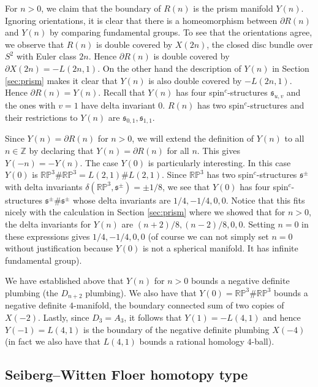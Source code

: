 \documentclass{amsart}
\theoremstyle{definition}
\theoremstyle{remark}
\numberwithin{equation}{section}
\begin{document}
For $n > 0$, we claim that the boundary of $R(n)$ is the prism manifold $Y(n)$. Ignoring orientations, it is clear that there is a homeomorphism between $\partial R(n)$ and $Y(n)$ by comparing fundamental groups. To see that the orientations agree, we observe that $R(n)$ is double covered by $X(2n)$, the closed disc bundle over $S^2$ with Euler class $2n$. Hence $\partial R(n)$ is double covered by $\partial X(2n) = -L(2n,1)$. On the other hand the description of $Y(n)$ in Section \ref{sec:prism} makes it clear that $Y(n)$ is also double covered by $-L(2n,1)$. Hence $\partial R(n) = Y(n)$. Recall that $Y(n)$ has four spin$^c$-structures $\mathfrak{s}_{u,v}$ and the ones with $v=1$ have delta invariant $0$. $R(n)$ has two spin$^c$-structures and their restrictions to $Y(n)$ are $\mathfrak{s}_{0,1}, \mathfrak{s}_{1,1}$.

Since $Y(n) = \partial R(n)$ for $n > 0$, we will extend the definition of $Y(n)$ to all $n \in \mathbb{Z}$ by declaring that $Y(n) = \partial R(n)$ for all $n$. This gives $Y(-n) = -Y(n)$. The case $Y(0)$ is particularly interesting. In this case $Y(0)$ is $\mathbb{RP}^3 \# \mathbb{RP}^3 = L(2,1) \# L(2,1)$. Since $\mathbb{RP}^3$ has two spin$^c$-structures $\mathfrak{s}^{\pm}$ with delta invariants $\delta( \mathbb{RP}^3 , \mathfrak{s}^{\pm} ) = \pm 1/8$, we see that $Y(0)$ has four spin$^c$-structures $\mathfrak{s}^{\pm} \# \mathfrak{s}^{\pm}$ whose delta invariants are $1/4, -1/4, 0 , 0$. Notice that this fits nicely with the calculation in Section \ref{sec:prism} where we showed that for $n>0$, the delta invariants for $Y(n)$ are $(n+2)/8, (n-2)/8 , 0 , 0$. Setting $n=0$ in these expressions gives $1/4, -1/4 , 0 , 0$ (of course we can not simply set $n=0$ without justification because $Y(0)$ is not a spherical manifold. It has infinite fundamental group).

We have established above that $Y(n)$ for $n>0$ bounds a negative definite plumbing (the $D_{n+2}$ plumbing). We also have that $Y(0) = \mathbb{RP}^3 \# \mathbb{RP}^3$ bounds a negative definite $4$-manifold, the boundary connected sum of two copies of $X(-2)$. Lastly, since $D_3 = A_3$, it follows that $Y(1) = -L(4,1)$ and hence $Y(-1) = L(4,1)$ is the boundary of the negative definite plumbing $X(-4)$ (in fact we also have that $L(4,1)$ bounds a rational homology $4$-ball).

\subsection{Seiberg--Witten Floer homotopy type}\label{sec:swf}
\end{document}
